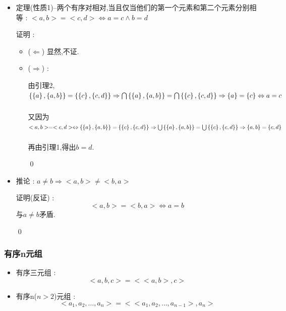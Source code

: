 {{{{\begin{itemize}
{            证明 : \begin{enumerate}
              \item $\forall x,x \in \updownUnion{~}{~}\mathcal{A} \Leftrightarrow \exists z(z \in \mathcal{A} \land x \in z) \Leftrightarrow \exists z(z \in \mathcal{B} \land x \in z) \Leftrightarrow x \in \updownUnion{~}{~}\mathcal{B}$
              \item $\forall x,x \in \updownIntersection{~}{~}\mathcal{A} \Leftrightarrow \forall z(z \in \mathcal{A} \land x \in z) \Leftrightarrow \forall z(z \in \mathcal{B} \land x \in z) \Leftrightarrow x \in \updownIntersection{~}{~}\mathcal{B}$
            \end{enumerate}

            \qed
            }
      \item {
            定理(性质1)--两个有序对相对,当且仅当他们的第一个元素和第二个元素分别相等 : $<a,b> = <c,d> \Leftrightarrow a = c \land b = d$

            证明 : \begin{itemize}
              \item ($\Leftarrow$) 显然,不证.
              \item{
                    ($\Rightarrow$) :

                    由引理2,$\left\{ \left\{ a \right\},\left\{ a,b \right\} \right\} = \left\{ \left\{ c \right\},\left\{ c,d \right\} \right\} \Rightarrow \bigcap\limits_{~}^{~}\left\{ \left\{ a \right\},\left\{ a,b \right\} \right\} = \bigcap\limits_{~}^{~}\left\{ \left\{ c \right\},\left\{ c,d \right\} \right\} \Rightarrow \left\{ a \right\} = \left\{ c \right\} \Leftrightarrow a = c$

                    又因为$<a,b> = <c,d> \Leftrightarrow \left\{ \left\{ a \right\},\left\{ a,b \right\} \right\} = \left\{ \left\{ c \right\},\left\{ c,d \right\} \right\} \Rightarrow \bigcup\limits_{~}^{~}\left\{ \left\{ a \right\},\left\{ a,b \right\} \right\} = \bigcup\limits_{~}^{~}\left\{ \left\{ c \right\},\left\{ c,d \right\} \right\} \Rightarrow \left\{ a,b \right\} = \left\{ c,d \right\}$

                    再由引理1,得出$b = d$.

                    \qed
                    }
            \end{itemize}
            }
      \item {
            推论 : $a \neq b \Rightarrow <a,b> \neq <b,a>$

            证明(反证) : $$
              <a,b> = <b,a> \Leftrightarrow a = b
            $$
            与$a \neq b$矛盾.

            \qed
            }
    \end{itemize}
  }%

  \subsubsection{有序n元组}{
    \begin{itemize}
      \item {
            有序三元组 : $$
              <a,b,c> = <<a,b>,c>
            $$
            }
      \item {
            有序n($n > 2$)元组 : $$
              <a_1,a_2,\dots,a_n> = <<a_1,a_2,\dots,a_{n - 1}>,a_n>
            $$
            }
    \end{itemize}

}}}}
